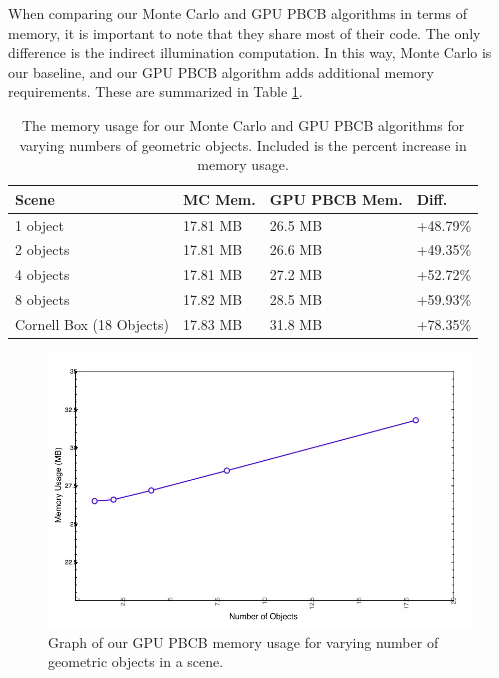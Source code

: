 When comparing our Monte Carlo and GPU PBCB algorithms in terms of memory, it is important to note that they share most of their code. The only difference is the indirect illumination computation. In this way, Monte Carlo is our baseline, and our GPU PBCB algorithm adds additional memory requirements. These are summarized in Table \ref{tbl:memory}.

\begin{table}[h!]
   \centering
   \begin{tabular}{ | l | l | l | l | }
   \hline
   \textbf{Scene} & \textbf{MC Mem.} & \textbf{GPU PBCB Mem.} & \textbf {Diff.} \\ \hline
   1 object & 17.81 MB & 26.5 MB & +48.79\% \\ \hline
   2 objects & 17.81 MB & 26.6 MB & +49.35\% \\ \hline
   4 objects & 17.81 MB & 27.2 MB & +52.72\% \\ \hline
   8 objects & 17.82 MB & 28.5 MB & +59.93\% \\ \hline
   Cornell Box (18 Objects) & 17.83 MB & 31.8 MB & +78.35\% \\ \hline
   \end{tabular}
   \captionfonts
   \caption[Memory usage]{The memory usage for our Monte Carlo and GPU PBCB algorithms for varying numbers of geometric objects. Included is the percent increase in memory usage.}
   \label{tbl:memory}
\end{table}

\begin{figure}[h!]
    \centering
    \includegraphics[width=150mm]{../img/memory.png}
    \caption[Memory Usage Graph]{Graph of our GPU PBCB memory usage for varying number of geometric objects in a scene.}
    \label{fig:memory_graph}
\end{figure}

